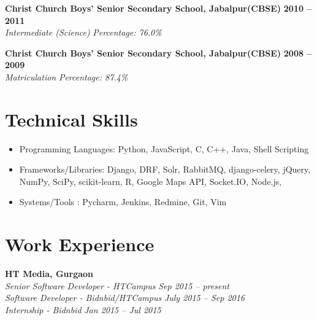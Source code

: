 \documentclass[margin,line]{resume}
\begin{document}
\begin{resume}
    \textbf{Christ Church Boys' Senior Secondary School, Jabalpur(CBSE)} \hfill \textbf{2010 -- 2011}\vspace{0mm}\\\vspace{0mm}%
    \textsl{Intermediate (Science)} \hfill \textsl{Percentage: 76.0\%}

    \textbf{Christ Church Boys' Senior Secondary School, Jabalpur(CBSE)} \hfill \textbf{2008 -- 2009}\vspace{0mm}\\\vspace{0mm}%
    \textsl{Matriculation } \hfill \textsl{Percentage: 87.4\%}
    \section{\mysidestyle Technical Skills}
     \begin{itemize}
      \item Programming Languages: Python, JavaScript, C, C++, Java, Shell Scripting
      \item Frameworks/Libraries: Django, DRF, Solr, RabbitMQ, django-celery, jQuery, NumPy, SciPy, scikit-learn, R, Google Maps API, Socket.IO, Node.js, 
      \item Systems/Tools : Pycharm, Jenkins, Redmine, Git, Vim
     \end{itemize}
    \section{\mysidestyle Work Experience}

    \textbf{HT Media, Gurgaon}\\
           \textsl{Senior Software Developer - HTCampus} \hfill \textsl{Sep 2015 -- present} \vspace{0mm}\\\vspace{0mm}%
           \textsl{Software Developer - Bidnbid/HTCampus} \hfill \textsl{July 2015 -- Sep 2016} \vspace{0mm}\\\vspace{0mm}%
           \textsl{Internship - Bidnbid} \hfill \textsl{Jan 2015 -- Jul 2015} \vspace{0mm}\\\vspace{0mm}%
    \begin{itemize}
    

\end{itemize}
\end{resume}
\end{document}
